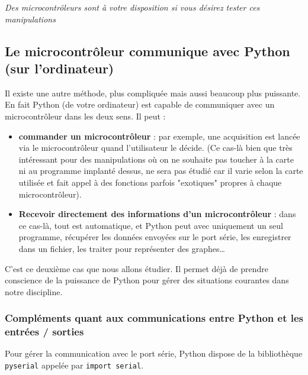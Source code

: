 \documentclass[11pt]{article}
\begin{document}
 
 \textit{Des microcontrôleurs sont à votre disposition si vous désirez tester ces manipulations}
 
 
 
 
 
 
 
 
 
 
 
 
 
 \subsection{Le microcontrôleur communique avec Python (sur l'ordinateur)}
 
 Il existe une autre méthode, plus compliquée mais aussi beaucoup plus puissante. En fait Python (de votre ordinateur) est capable de communiquer avec un microcontrôleur dans les deux sens. Il peut : 
 
 \smallskip
 
 \begin{itemize}
  \item \textbf{commander un microcontrôleur} : par exemple, une acquisition est lancée via le microcontrôleur quand l'utilisateur le décide. (Ce cas-là bien que très intéressant pour des manipulations où on ne souhaite pas toucher à la carte ni au programme implanté dessus, ne sera pas étudié car il varie selon la carte utilisée et fait appel à des fonctions parfois "exotiques" propres à chaque microcontrôleur).
  \item  \textbf{Recevoir directement des informations d'un microcontrôleur} : dans ce cas-là, tout est automatique, et Python peut avec uniquement un seul programme, récupérer les données envoyées sur le port série, les enregistrer dans un fichier, les traiter pour représenter des graphes\ldots
 \end{itemize}

 \smallskip
 
 C'est ce deuxième cas que nous allons étudier. Il permet déjà de prendre conscience de la puissance de Python pour gérer des situations courantes dans notre discipline.
 
 
 
 \subsubsection{Compléments quant aux communications entre Python et les entrées / sorties}
 
 Pour gérer la communication avec le port série, Python dispose de la bibliothèque \texttt{pyserial} appelée par \texttt{import serial}. 
 
\end{document}
